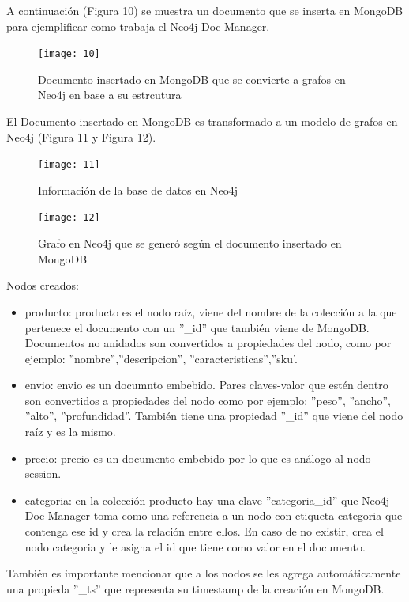 \documentclass[conference]{IEEEtran}
\begin{document}
A continuaci\'on (Figura 10) se muestra un documento que se inserta en MongoDB para ejemplificar como trabaja el Neo4j Doc Manager.

\begin{figure}[!h]
\centering
\texttt{[image: 10]}
\caption{Documento insertado en MongoDB que se convierte a grafos en Neo4j en base a su estrcutura}
\label{}
\end{figure}

El Documento insertado en MongoDB es transformado a un modelo de grafos en Neo4j (Figura 11 y Figura 12).\\

\begin{figure}[!h]
\centering
\texttt{[image: 11]}
\caption{Informaci\'on de la base de datos en Neo4j}
\label{}
\end{figure}

\begin{figure}[!h]
\centering
\texttt{[image: 12]}
\caption{Grafo en Neo4j que se gener\'o seg\'un el documento insertado en MongoDB}
\label{}
\end{figure}

Nodos creados:\\
\begin{itemize}
\item producto: producto es el nodo ra\'iz, viene del nombre de la colecci\'on a la que pertenece el documento con un  ''\_id'' que tambi\'en viene de MongoDB. Documentos no anidados son convertidos a propiedades del nodo, como por ejemplo: ''nombre'',''descripcion'', ''caracteristicas'',''sku'.
\item envio: envio es un documnto embebido. Pares claves-valor que est\'en dentro son convertidos a propiedades del nodo como por ejemplo: ''peso'', ''ancho'', ''alto'', ''profundidad''. Tambi\'en tiene una propiedad ''\_id'' que viene del nodo ra\'iz y es la mismo.
\item precio: precio es un documento embebido por lo que es análogo al nodo session.
\item categoria: en la colecci\'on producto hay una clave ''categoria\_id'' que Neo4j Doc Manager toma como una referencia a un nodo con etiqueta categoria que contenga ese id y crea la relaci\'on entre ellos. En caso de no existir, crea el nodo categoria y le asigna el id que tiene como valor en el documento.
\end{itemize}
También es importante mencionar que a los nodos se les agrega autom\'aticamente una propieda ''\_ts'' que representa su timestamp de la creaci\'on en MongoDB.\\
\end{document}
